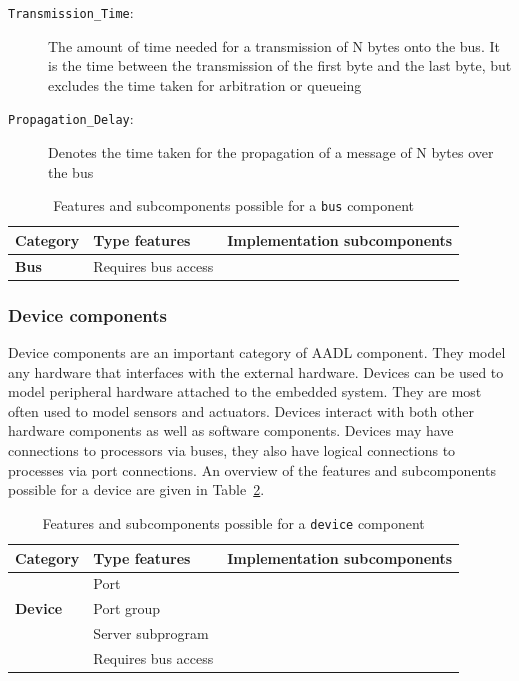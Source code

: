 \begin{description}
\item[\texttt{Transmission\_Time}:]{The amount of time needed for a
  transmission of N bytes onto the bus. It is the time between the
  transmission of the first byte and the last byte, but excludes the
  time taken for arbitration or queueing}
\item[\texttt{Propagation\_Delay}:]{Denotes the time taken for the
  propagation of a message of N bytes over the bus}
\end{description}

\begin{table}
\centering
\begin{tabular}{|l|l|l|}
\hline
\textbf{Category} & \textbf{Type features} & \textbf{Implementation
  subcomponents} \\
\hline
\textbf{Bus} & Requires bus access & \\
\hline
\end{tabular}
\caption{Features and subcomponents possible for a \texttt{bus}
  component}
\label{tab:bus_rules}
\end{table}

\subsubsection{Device components}
Device components are an important category of AADL component. They
model any hardware that interfaces with the external hardware. Devices
can be used to model peripheral hardware attached to the embedded
system. They are most often used to model sensors and
actuators. Devices interact with both other hardware components as
well as software components. Devices may have connections to
processors via buses, they also have logical connections to processes
via port connections. An overview of the features and subcomponents
possible for a device are given in Table~\ref{tab:dev_rules}.

\begin{table}
\centering
\begin{tabular}{|l|l|l|}
\hline
\textbf{Category} & \textbf{Type features} & \textbf{Implementation
  subcomponents} \\
\hline
 & Port & \\
\textbf{Device} & Port group & \\
 & Server subprogram & \\
 & Requires bus access & \\
\hline
\end{tabular}
\caption{Features and subcomponents possible for a \texttt{device}
  component}
\label{tab:dev_rules}
\end{table}


